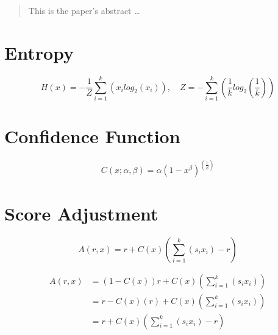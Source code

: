 \documentclass[12pt]{article}
\begin{document}
\maketitle

\begin{abstract}
This is the paper's abstract \ldots
\end{abstract}

\section{Entropy}

\begin{equation}
	H(x) = -\frac{1}{Z}\sum_{i=1}^k (x_i log_2(x_i)), \quad Z=-\sum_{i=1}^k \left(\frac{1}{k} log_2 \left(\frac{1}{k}\right)\right)
\end{equation}


\section{Confidence Function}

\begin{equation}
	C(x; \alpha, \beta) = \alpha (1-x^\beta)^{\left(\frac{1}{\beta}\right)}
\end{equation}


\section{Score Adjustment}

\begin{equation}
	A(r, x) = r + C(x) \left(\sum_{i=1}^k \left( s_i x_i\right) - r \right)
\end{equation}

\begin{align}
	A(r, x) &= (1-C(x)) r + C(x) \left(\sum_{i=1}^k \left( s_i x_i\right) \right)\\
	&= r - C(x)(r) + C(x) \left(\sum_{i=1}^k \left( s_i x_i\right) \right)\\
	&= r + C(x) \left(\sum_{i=1}^k \left( s_i x_i\right) - r \right)
\end{align}




\end{document}

